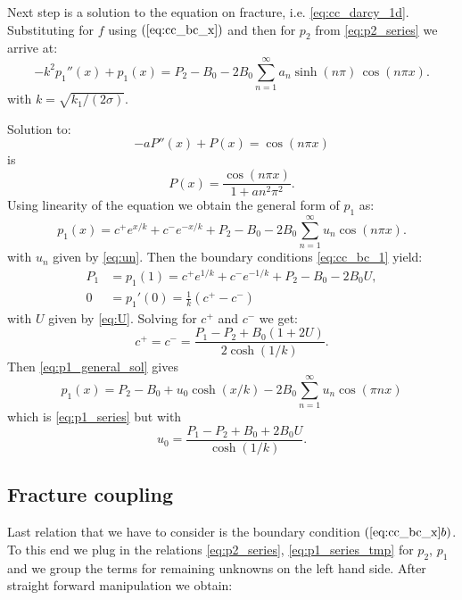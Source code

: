 \documentclass{elsarticle}
\begin{document}
 Next step is a solution to the equation on fracture, i.e. \eqref{eq:cc_darcy_1d}. 
 Substituting for $f$ using $(\ref{eq:cc_bc_x})$ and then for $p_2$ from \eqref{eq:p2_series}
 we arrive at: 
\begin{equation}
    \label{eq:p1_equation}
    -k^2 p_1''(x) + p_1 (x) = P_2 - B_0 - 2 B_0 \sum ^{\infty}_{n=1} a_n \sinh(n\pi)\, \cos (n\pi x).
\end{equation}
with $k = \sqrt{k_1 / (2 \sigma)}$.

Solution to:
\[
    - a P''(x) + P(x) = \cos(n \pi x) 
\]    
is 
\[
    P(x) = \frac{\cos(n \pi x)}{1+an^2\pi^2}.
\]
Using linearity of the equation we obtain the general form of $p_1$ as:
\begin {equation}
    \label{eq:p1_general_sol}        
    p_1(x) = c^+ e^{x/k} + c^- e^{-x/k} + P_2 - B_0 
    - 2 B_0 \sum^{\infty}_{n=1} u_n \cos (n\pi x).
\end {equation}
with $u_n$ given by \eqref{eq:un}. Then the boundary conditions \eqref{eq:cc_bc_1} yield:
\begin{align*}
P_1 &= p_1(1) = c^+e^{1/k} + c^- e^{-1/k} + P_2 - B_0 - 2 B_0 U, \\
0 &= p_1'(0) = \frac{1}{k}(c^+ - c^-) 
\end{align*}
with $U$ given by \eqref{eq:U}. Solving for $c^+$ and $c^-$ we get:
\[
  c^+ = c^- = \frac{P_1 - P_2 + B_0(1 + 2 U)}{2\cosh(1/k)}.
\]
Then \eqref{eq:p1_general_sol} gives 
\begin{equation}
    \label{eq:p1_series_tmp}
    p_1(x) = P_2 -  B_0 + u_0 \cosh(x/k) - 2B_0 \sum_{n=1}^\infty  u_n \cos(\pi n x) 
\end{equation}
which is \eqref{eq:p1_series} but with 
\begin{equation}
    \label{eq:u0_def}    
    u_0 = \frac{P_1 - P_2 + B_0 + 2 B_0 U}{\cosh(1/k)}.
\end{equation}



\subsection{Fracture coupling}
\label{sec:cont_coupling}

Last relation that we have to consider is the boundary condition $(\ref{eq:cc_bc_x}b)$. To this end we plug in the relations \eqref{eq:p2_series}, 
\eqref{eq:p1_series_tmp} for $p_2$, $p_1$  and we group the terms for remaining unknowns on the left hand side. After straight forward
manipulation we obtain:
\end{document}
